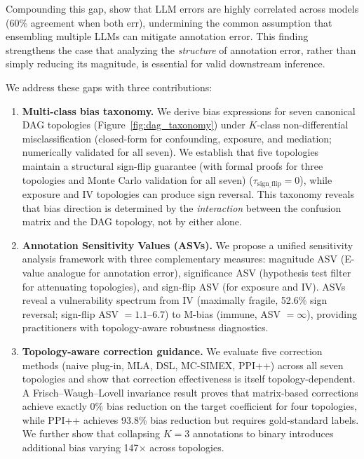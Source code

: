 Compounding this gap, \citet{kim_garg2025} show that LLM errors are highly correlated across models (60\% agreement when both err), undermining the common assumption that ensembling multiple LLMs can mitigate annotation error. This finding strengthens the case that analyzing the \emph{structure} of annotation error, rather than simply reducing its magnitude, is essential for valid downstream inference.

We address these gaps with three contributions:

\begin{enumerate}
\item \textbf{Multi-class bias taxonomy.} We derive bias expressions for seven canonical DAG topologies (Figure~\ref{fig:dag_taxonomy}) under $K$-class non-differential misclassification (closed-form for confounding, exposure, and mediation; numerically validated for all seven). We establish that five topologies maintain a structural sign-flip guarantee (with formal proofs for three topologies and Monte Carlo validation for all seven) ($\tau_{\text{sign\_flip}} = 0$), while exposure and IV topologies can produce sign reversal. This taxonomy reveals that bias direction is determined by the \emph{interaction} between the confusion matrix and the DAG topology, not by either alone.

\item \textbf{Annotation Sensitivity Values (ASVs).} We propose a unified sensitivity analysis framework with three complementary measures: magnitude ASV (E-value analogue for annotation error), significance ASV (hypothesis test filter for attenuating topologies), and sign-flip ASV (for exposure and IV). ASVs reveal a vulnerability spectrum from IV (maximally fragile, 52.6\% sign reversal; sign-flip ASV $= 1.1$--$6.7$) to M-bias (immune, ASV $= \infty$), providing practitioners with topology-aware robustness diagnostics.

\item \textbf{Topology-aware correction guidance.} We evaluate five correction methods (naive plug-in, MLA, DSL, MC-SIMEX, PPI++) across all seven topologies and show that correction effectiveness is itself topology-dependent. A Frisch--Waugh--Lovell invariance result proves that matrix-based corrections achieve exactly 0\% bias reduction on the target coefficient for four topologies, while PPI++ achieves 93.8\% bias reduction but requires gold-standard labels. We further show that collapsing $K{=}3$ annotations to binary introduces additional bias varying 147$\times$ across topologies.
\end{enumerate}
